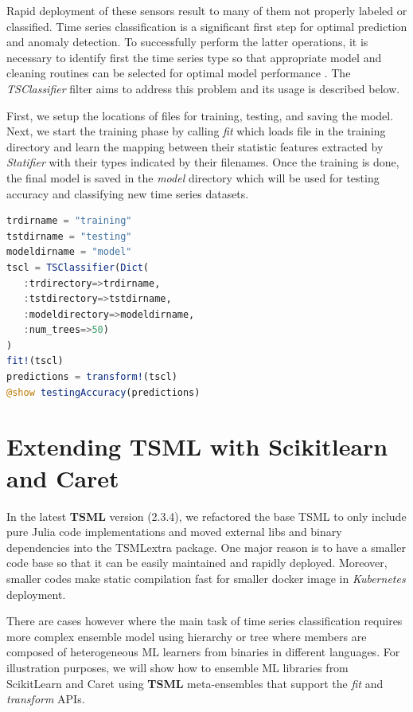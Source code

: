 \documentclass{juliacon}
\begin{document}
Rapid deployment of these sensors result to many of them not properly labeled or classified.
Time series classification is a significant first step for optimal prediction and anomaly detection.
To successfully perform the latter operations, it is necessary to identify first the time series
type so that appropriate model and cleaning routines can be selected for optimal model performance . 
The  \emph{TSClassifier} filter aims to address this problem and its usage is described below.

\vskip 6pt
First, we setup the locations of files for training, testing, and saving the model.
Next, we start the training phase by calling \emph{fit} which loads
file in the training directory and learn the mapping between their
statistic features extracted by \emph{Statifier} with their types indicated
by their filenames. Once the training is done, the final model
is saved in the \emph{model} directory which will be used for 
testing accuracy and classifying new time series datasets. 

\begin{lstlisting}[language = Julia]
trdirname = "training"
tstdirname = "testing"
modeldirname = "model"
tscl = TSClassifier(Dict(
   :trdirectory=>trdirname,
   :tstdirectory=>tstdirname,
   :modeldirectory=>modeldirname,
   :num_trees=>50)
)
fit!(tscl)
predictions = transform!(tscl)
@show testingAccuracy(predictions)
\end{lstlisting}

\section{Extending TSML with Scikitlearn and Caret}
In the latest \textbf{TSML} version (2.3.4), we refactored the base TSML
to only include pure Julia code implementations and moved
external libs and binary dependencies into the TSMLextra package. 
One major reason is to have a smaller code base so that it can be easily
maintained and rapidly deployed. Moreover, smaller codes make
static compilation fast for smaller docker image  
in \emph{Kubernetes} deployment. 

There are cases however where the main task of time series classification 
requires more complex ensemble model using hierarchy or tree where 
members are composed of heterogeneous ML learners from binaries in 
different languages. For illustration purposes, we will show how to 
ensemble ML libraries from ScikitLearn and Caret using \textbf{TSML} 
meta-ensembles that support the \emph{fit} and \emph{transform} APIs.
\end{document}

